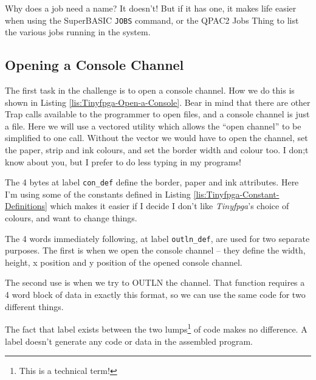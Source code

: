 Why does a job need a name? It doesn't! But if it has one, it makes
life easier when using the SuperBASIC \texttt{JOBS} command, or the
QPAC2 Jobs Thing to list the various jobs running in the system.

\subsection{Opening a Console Channel}

The first task in the challenge is to open a console channel. How
we do this is shown in Listing \ref{lis:Tinyfpga-Open-a-Console}.
Bear in mind that there are other Trap calls available to the programmer
to open files, and a console channel is just a file. Here we will
use a vectored utility which allows the ``open channel'' to be simplified
to one call. Without the vector we would have to open the channel,
set the paper, strip and ink colours, and set the border width and
colour too. I don;t know about you, but I prefer to do less typing
in my programs!

The 4 bytes at label \texttt{con\_def} define the border, paper and
ink attributes. Here I'm using some of the constants defined in Listing
\ref{lis:Tinyfpga-Constant-Definitions} which makes it easier if
I decide I don't like \emph{Tinyfpga}'s choice of colours, and want
to change things. 

The 4 words immediately following, at label \texttt{outln\_def}, are
used for two separate purposes. The first is when we open the console
channel -- they define the width, height, x position and y position
of the opened console channel.

The second use is when we try to OUTLN the channel. That function
requires a 4 word block of data in exactly this format, so we can
use the same code for two different things.

The fact that label exists between the two lumps\footnote{This is a technical term!}
of code makes no difference. A label doesn't generate any code or
data in the assembled program.


